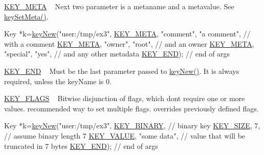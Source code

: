 \begin{DoxyItemize}
\item \hyperlink{group__key_gga9b703ca49f48b482def322b77d3e6bc8a040582834bb2d90049947d7ef74e87e2}{K\+E\+Y\+\_\+\+M\+E\+TA} ~\newline
 Next two parameter is a metaname and a metavalue. See \hyperlink{group__keymeta_gae1f15546b234ffb6007d8a31178652b9}{key\+Set\+Meta()}. 
\begin{DoxyCodeInclude}
Key *k=\hyperlink{group__key_gad23c65b44bf48d773759e1f9a4d43b89}{keyNew}(\textcolor{stringliteral}{"user:/tmp/ex3"},
        \hyperlink{group__key_gga9b703ca49f48b482def322b77d3e6bc8a040582834bb2d90049947d7ef74e87e2}{KEY\_META}, \textcolor{stringliteral}{"comment"}, \textcolor{stringliteral}{"a comment"},  \textcolor{comment}{// with a comment}
        \hyperlink{group__key_gga9b703ca49f48b482def322b77d3e6bc8a040582834bb2d90049947d7ef74e87e2}{KEY\_META}, \textcolor{stringliteral}{"owner"}, \textcolor{stringliteral}{"root"},         \textcolor{comment}{// and an owner}
        \hyperlink{group__key_gga9b703ca49f48b482def322b77d3e6bc8a040582834bb2d90049947d7ef74e87e2}{KEY\_META}, \textcolor{stringliteral}{"special"}, \textcolor{stringliteral}{"yes"},        \textcolor{comment}{// and any other metadata}
        \hyperlink{group__key_gga9b703ca49f48b482def322b77d3e6bc8aa8adb6fcb92dec58fb19410eacfdd403}{KEY\_END});                  \textcolor{comment}{// end of args}
\end{DoxyCodeInclude}

\item \hyperlink{group__key_gga9b703ca49f48b482def322b77d3e6bc8aa8adb6fcb92dec58fb19410eacfdd403}{K\+E\+Y\+\_\+\+E\+ND} ~\newline
 Must be the last parameter passed to \hyperlink{group__key_gad23c65b44bf48d773759e1f9a4d43b89}{key\+New()}. It is always required, unless the {\ttfamily key\+Name} is 0.
\item \hyperlink{group__key_gga9b703ca49f48b482def322b77d3e6bc8a4b83f86a07a7a0d6e24ecafe43cfea1b}{K\+E\+Y\+\_\+\+F\+L\+A\+GS} ~\newline
 Bitwise disjunction of flags, which don\textquotesingle{}t require one or more values. recommended way to set multiple flags. overrides previously defined flags. 
\begin{DoxyCodeInclude}
Key *k=\hyperlink{group__key_gad23c65b44bf48d773759e1f9a4d43b89}{keyNew}(\textcolor{stringliteral}{"user:/tmp/ex3"},
        \hyperlink{group__key_gga9b703ca49f48b482def322b77d3e6bc8a1ca18d4e094ae7487d35ecedda2235ff}{KEY\_BINARY},                   \textcolor{comment}{// binary key}
        \hyperlink{group__key_gga9b703ca49f48b482def322b77d3e6bc8a6d531b5c41445d19d0452eebdccbfa01}{KEY\_SIZE}, 7,                    \textcolor{comment}{// assume binary length 7}
        \hyperlink{group__key_gga9b703ca49f48b482def322b77d3e6bc8ac66e4a49d09212b79f5754ca6db5bd2e}{KEY\_VALUE}, \textcolor{stringliteral}{"some data"},                \textcolor{comment}{// value that will be truncated in 7 bytes}
        \hyperlink{group__key_gga9b703ca49f48b482def322b77d3e6bc8aa8adb6fcb92dec58fb19410eacfdd403}{KEY\_END});                        \textcolor{comment}{// end of args}
\end{DoxyCodeInclude}


\end{DoxyItemize}
